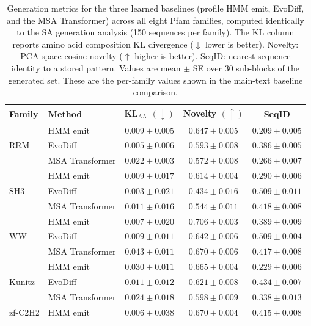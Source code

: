 \documentclass[10pt]{article}
\begin{document}
\begin{table}[ht]
\centering
\caption{Generation metrics for the three learned baselines (profile HMM emit, EvoDiff, and the MSA Transformer) across all eight Pfam families, computed identically to the SA generation analysis (150 sequences per family). The KL column reports amino acid composition KL divergence ($\downarrow$ lower is better). Novelty: PCA-space cosine novelty ($\uparrow$ higher is better). SeqID: nearest sequence identity to a stored pattern. Values are mean $\pm$ SE over 30 sub-blocks of the generated set. These are the per-family values shown in the main-text baseline comparison.}
\label{tab:baseline-metrics}
\small
\begin{tabular}{@{}llccc@{}}
\toprule
Family & Method & KL$_{\mathrm{AA}}$ $(\downarrow)$ & Novelty $(\uparrow)$ & SeqID \\
\midrule
\multirow{3}{*}{RRM}
 & HMM emit        & $0.009 \pm 0.005$ & $0.647 \pm 0.005$ & $0.209 \pm 0.005$ \\
 & EvoDiff         & $0.005 \pm 0.006$ & $0.593 \pm 0.008$ & $0.386 \pm 0.005$ \\
 & MSA Transformer & $0.022 \pm 0.003$ & $0.572 \pm 0.008$ & $0.266 \pm 0.007$ \\
\midrule
\multirow{3}{*}{SH3}
 & HMM emit        & $0.009 \pm 0.017$ & $0.614 \pm 0.004$ & $0.290 \pm 0.006$ \\
 & EvoDiff         & $0.003 \pm 0.021$ & $0.434 \pm 0.016$ & $0.509 \pm 0.011$ \\
 & MSA Transformer & $0.011 \pm 0.016$ & $0.544 \pm 0.011$ & $0.418 \pm 0.008$ \\
\midrule
\multirow{3}{*}{WW}
 & HMM emit        & $0.007 \pm 0.020$ & $0.706 \pm 0.003$ & $0.389 \pm 0.009$ \\
 & EvoDiff         & $0.009 \pm 0.011$ & $0.642 \pm 0.006$ & $0.509 \pm 0.004$ \\
 & MSA Transformer & $0.043 \pm 0.011$ & $0.670 \pm 0.006$ & $0.417 \pm 0.008$ \\
\midrule
\multirow{3}{*}{Kunitz}
 & HMM emit        & $0.030 \pm 0.011$ & $0.665 \pm 0.004$ & $0.229 \pm 0.006$ \\
 & EvoDiff         & $0.011 \pm 0.012$ & $0.621 \pm 0.008$ & $0.434 \pm 0.007$ \\
 & MSA Transformer & $0.024 \pm 0.018$ & $0.598 \pm 0.009$ & $0.338 \pm 0.013$ \\
\midrule
\multirow{3}{*}{zf-C2H2}
 & HMM emit        & $0.006 \pm 0.038$ & $0.670 \pm 0.004$ & $0.415 \pm 0.008$ \\

\end{tabular}
\end{table}
\end{document}
